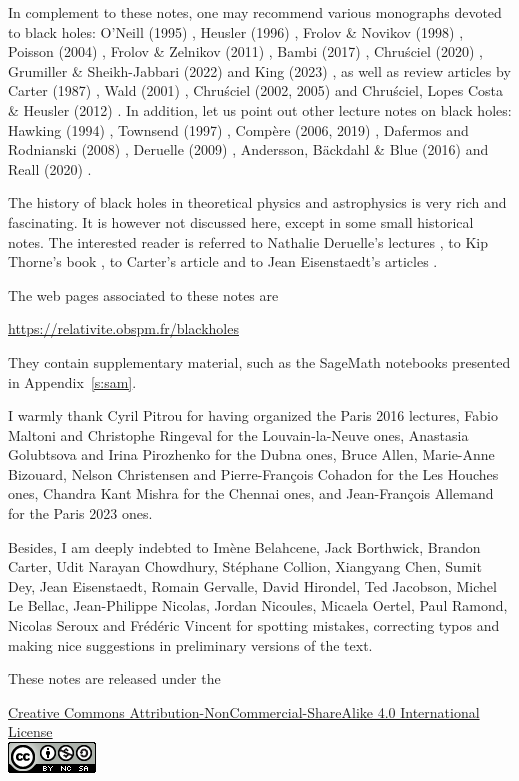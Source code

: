 In complement to these notes, one may recommend various monographs devoted to black holes:
O'Neill (1995) \cite{ONeil95}, Heusler (1996) \cite{Heusl96}, Frolov \& Novikov (1998) \cite{FroloN98},
Poisson (2004) \cite{Poiss04}, Frolov \& Zelnikov (2011) \cite{FroloZ11}, Bambi (2017) \cite{Bambi17},
Chru\'sciel (2020) \cite{Chrus20}, Grumiller \& Sheikh-Jabbari (2022) \cite{GrumiS22}
and King (2023) \cite{King23},
as well as review articles by
Carter (1987) \cite{Carte87}, Wald (2001) \cite{Wald01},
Chru\'sciel (2002, 2005) \cite{Chrus02, Chrus05} and Chru\'sciel, Lopes Costa \& Heusler (2012) \cite{ChrusLH12}.
In addition, let us point out other lecture notes on black holes:
Hawking (1994) \cite{Hawki94,HawkiP15}, Townsend (1997) \cite{Towns97},
Compère (2006, 2019) \cite{Compe06,Compe19}, Dafermos and Rodnianski (2008) \cite{DaferR13},
Deruelle (2009) \cite{Derue09}, Andersson, Bäckdahl \& Blue (2016) \cite{AnderBB18}
and Reall (2020) \cite{Reall20}.

The history of black holes in theoretical physics and astrophysics is
very rich and fascinating. It is however not discussed here, except in some
small historical notes. The interested
reader is referred to Nathalie Deruelle's lectures \cite{Derue09}, to Kip Thorne's
book \cite{Thorn94}, to Carter's article \cite{Carte06}
and to Jean Eisenstaedt's articles \cite{Eisen82,Eisen93}.


The web pages associated to these notes are
\begin{center}
\url{https://relativite.obspm.fr/blackholes}
\end{center}
They contain supplementary material, such as the SageMath notebooks presented in
Appendix~\ref{s:sam}.

\vspace{2ex}

I warmly thank Cyril Pitrou for having organized the Paris 2016 lectures,
Fabio Maltoni and Christophe Ringeval for the Louvain-la-Neuve ones,
Anastasia Golubtsova and Irina Pirozhenko for the Dubna ones,
Bruce Allen, Marie-Anne Bizouard, Nelson Christensen and Pierre-François Cohadon for the Les Houches ones,
Chandra Kant Mishra for the Chennai ones,
and Jean-François Allemand for the Paris 2023 ones.

Besides, I am deeply indebted to
Imène Belahcene, Jack Borthwick, Brandon Carter,
Udit Narayan Chowdhury, Stéphane Collion, Xiangyang Chen,
Sumit Dey, Jean Eisenstaedt, Romain Gervalle, David Hirondel,
Ted Jacobson, Michel Le Bellac, Jean-Philippe Nicolas, Jordan Nicoules, Micaela Oertel,
Paul Ramond, Nicolas Seroux and Frédéric Vincent for spotting mistakes, correcting typos and making
nice suggestions in preliminary versions of the text.


\vspace{3ex}
These notes are released under the
\begin{center}
\href{https://creativecommons.org/licenses/by-nc-sa/4.0/}{{Creative Commons Attribution-NonCommercial-ShareAlike 4.0 International License}}\\[1ex]
\includegraphics[height=0.03\textheight]{cc_license.png}
\end{center}

